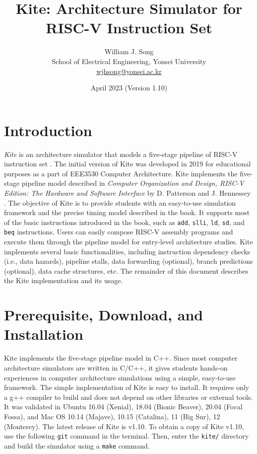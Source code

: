 \documentclass[10pt]{article}
\begin{document}
\title{Kite: Architecture Simulator for RISC-V Instruction Set}
\author{William J. Song\\
        School of Electrical Engineering, Yonsei University\\
        \href{mailto:wjhsong@yonsei.ac.kr}{wjhsong@yonsei.ac.kr}}
\date{April 2023 (Version 1.10)}
\maketitle


\section{Introduction} \label{sec:introduction}
\emph{Kite} is an architecture simulator that models a five-stage pipeline of RISC-V instruction set \cite{waterman_riscv2019}.
The initial version of Kite was developed in 2019 for educational purposes as a part of EEE3530 Computer Architecture.
Kite implements the five-stage pipeline model described in \emph{Computer Organization and Design, RISC-V Edition: The Hardware and Software Interface} by D. Patterson and J. Hennessey \cite{patterson_morgan2017}.
The objective of Kite is to provide students with an easy-to-use simulation framework and the precise timing model described in the book.
It supports most of the basic instructions introduced in the book, such as {\tt add}, {\tt slli}, {\tt ld}, {\tt sd}, and {\tt beq} instructions.
Users can easily compose RISC-V assembly programs and execute them through the pipeline model for entry-level architecture studies.
Kite implements several basic functionalities, including instruction dependency checks (i.e., data hazards), pipeline stalls, data forwarding (optional), branch predictions (optional), data cache structures, etc.
The remainder of this document describes the Kite implementation and its usage.


\section{Prerequisite, Download, and Installation} \label{sec:install}
Kite implements the five-stage pipeline model in C++.
Since most computer architecture simulators are written in C/C++, it gives students hands-on experiences in computer architecture simulations using a simple, easy-to-use framework.
The simple implementation of Kite is easy to install.
It requires only a g++ compiler to build and does not depend on other libraries or external tools.
It was validated in Ubuntu 16.04 (Xenial), 18.04 (Bionic Beaver), 20.04 (Focal Fossa), and Mac OS 10.14 (Majave), 10.15 (Catalina), 11 (Big Sur), 12 (Monterey).
The latest release of Kite is v1.10.
To obtain a copy of Kite v1.10, use the following {\tt git} command in the terminal.
Then, enter the {\tt kite/} directory and build the simulator using a {\tt make} command.
\end{document}

